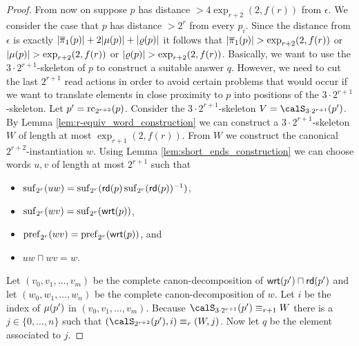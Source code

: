 \begin{proof}
	From now on suppose $p$ has distance $> 4\exp_{r+2}(2, f(r))$ from $\epsilon$.
	We consider the case that $p$ has distance $>2^r$ from every $p_i$.
	Since the distance from $\epsilon$ is exactly $|\overline{\pi}_1(p)| + 2|\mu(p)| + |\varrho(p)|$ it follows that $|\overline{\pi}_1(p)| > \exp_{r+2}(2,f(r))$ or $|\mu(p)| > \exp_{r+2}(2,f(r))$ or $|\varrho(p)| > \exp_{r+2}(2,f(r))$. 
	Basically, we want to use the $3\cdot 2^{r+1}$-skeleton of $p$ to construct a suitable answer $q$. However, we need to cut the last $2^{r+1}$ read actions in order to avoid certain problems that would occur if we want to translate elements in close proximity to $p$ into positions of the $3\cdot 2^{r+1}$-skeleton.   
	Let $p'= \operatorname{rc}_{2^{r+2}}(p)$.  Consider 
	the $3\cdot 2^{r+1}$-skeleton $V = \calS_{3\cdot 2^{r+1}}(p')$. By Lemma \ref{lem:r-equiv_word_construction} we can construct a $3\cdot 2^{r+1}$-skeleton $W$ of length at most $\exp_{r+1}(2,f(r))$. From $W$ we construct the canonical $2^{r+2}$-instantiation $w$. Using Lemma \ref{lem:short_ends_construction} we can choose words $u,v$ of length at most 
	$2^{r+1}$ such that 
	\begin{itemize}
		\item $\operatorname{suf}_{2^{r}}(uw) = \operatorname{suf}_{2^{r}}(\mathsf{rd}(p)\operatorname{suf}_{2^{r}}(\mathsf{rd}(p))^{-1} )$,
		\item $\operatorname{suf}_{2^{r}}(wv) = \operatorname{suf}_{2^{r}}(\mathsf{wrt}(p))$,
		\item $\operatorname{pref}_{2^{r}}(wv) = \operatorname{pref}_{2^{r}}(\mathsf{wrt}(p))$, and
		\item $uw\sqcap wv = w$.
	\end{itemize}
	Let $(v_0,v_1,\ldots, v_m)$ be the complete canon-decomposition of $\mathsf{wrt}(p')\sqcap \mathsf{rd}(p')$ and let $(w_0, w_1,\ldots, w_n)$ be the complete canon-decomposition of $w$. Let $i$
	be the index of $\mu(p')$ in $(v_0,v_1,\ldots, v_m)$. Because $\calS_{3\cdot 2^{r+1}}(p') \equiv_{r+1} W$ there is a $j\in \{0,\ldots,n\}$ such that $(\calS_{2^{r+2}}(p'), i) \equiv_r (W,j)$.
	Now let $q$ be the element associated to $j$.
	

\end{proof}
